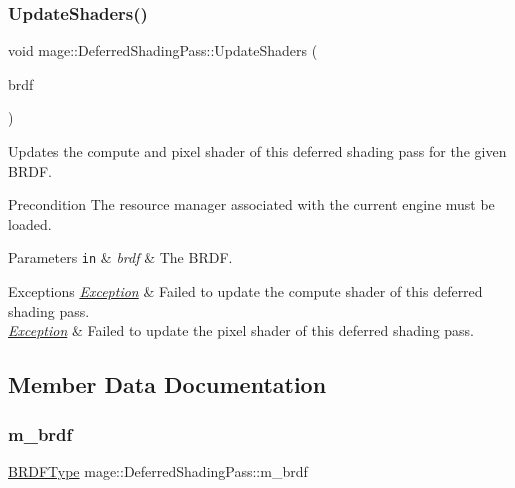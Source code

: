 \subsubsection{\texorpdfstring{Update\+Shaders()}{UpdateShaders()}}
{\footnotesize\ttfamily void mage\+::\+Deferred\+Shading\+Pass\+::\+Update\+Shaders (\begin{DoxyParamCaption}\item[{\hyperlink{namespacemage_af1044f87544bc38427766a8c795d2f26}{B\+R\+D\+F\+Type}}]{brdf }\end{DoxyParamCaption})\hspace{0.3cm}{\ttfamily [private]}}

Updates the compute and pixel shader of this deferred shading pass for the given B\+R\+DF.

\begin{DoxyPrecond}{Precondition}
The resource manager associated with the current engine must be loaded. 
\end{DoxyPrecond}

\begin{DoxyParams}[1]{Parameters}
\mbox{\tt in}  & {\em brdf} & The B\+R\+DF. \\
\hline
\end{DoxyParams}

\begin{DoxyExceptions}{Exceptions}
{\em \hyperlink{classmage_1_1_exception}{Exception}} & Failed to update the compute shader of this deferred shading pass. \\
\hline
{\em \hyperlink{classmage_1_1_exception}{Exception}} & Failed to update the pixel shader of this deferred shading pass. \\
\hline
\end{DoxyExceptions}


\subsection{Member Data Documentation}
\hypertarget{classmage_1_1_deferred_shading_pass_a5a466f5c2ee71563f4f8ed6d042ee4b3}{}\label{classmage_1_1_deferred_shading_pass_a5a466f5c2ee71563f4f8ed6d042ee4b3} 
\subsubsection{\texorpdfstring{m\+\_\+brdf}{m\_brdf}}
{\footnotesize\ttfamily \hyperlink{namespacemage_af1044f87544bc38427766a8c795d2f26}{B\+R\+D\+F\+Type} mage\+::\+Deferred\+Shading\+Pass\+::m\+\_\+brdf\hspace{0.3cm}{\ttfamily [private]}}

